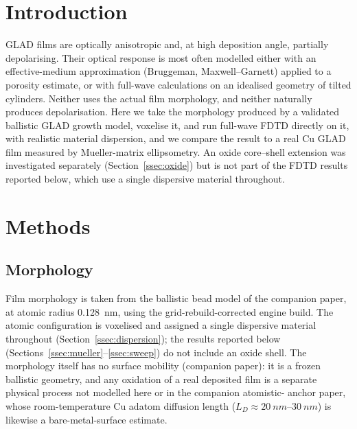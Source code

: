 \documentclass[aip,jcp,amsmath,amssymb,reprint]{revtex4-1}
\begin{document}
\section{Introduction}
\label{sec:intro}
GLAD films are optically anisotropic and, at high deposition angle, partially
depolarising. Their optical response is most often modelled either with an
effective-medium approximation (Bruggeman, Maxwell--Garnett) applied to a
porosity estimate, or with full-wave calculations on an idealised geometry of
tilted cylinders. Neither uses the actual film morphology, and neither naturally
produces depolarisation. Here we take the morphology produced by a validated
ballistic GLAD growth model, voxelise it, and run full-wave FDTD directly on it,
with realistic material dispersion, and we compare the result to a real Cu
GLAD film measured by Mueller-matrix ellipsometry. An oxide core--shell
extension was investigated separately (Section~\ref{ssec:oxide}) but is not
part of the FDTD results reported below, which use a single dispersive
material throughout.

\section{Methods}
\label{sec:methods}

\subsection{Morphology}
Film morphology is taken from the ballistic bead model of the companion paper,
at atomic radius \SI{0.128}{nm}, using the grid-rebuild-corrected engine build.
The atomic configuration is voxelised and assigned a single dispersive
material throughout (Section~\ref{ssec:dispersion}); the results reported
below (Sections~\ref{ssec:mueller}--\ref{ssec:sweep}) do not include an oxide
shell. The morphology itself has no surface mobility (companion paper): it is
a frozen ballistic geometry, and any oxidation of a real deposited film is a
separate physical process not modelled here or in the companion atomistic-
anchor paper, whose room-temperature Cu adatom diffusion length
($L_D\approx\SIrange{20}{30}{nm}$) is likewise a bare-metal-surface estimate.
\end{document}
